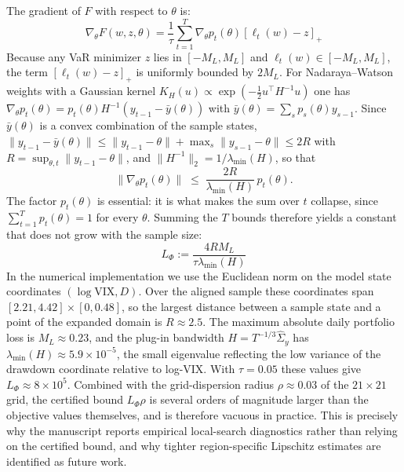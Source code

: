 \documentclass[smallcondensed]{svjour3}
\begin{document}
The gradient of $F$ with respect to $\theta$ is:
\begin{equation}
    \nabla_\theta F(w, z, \theta) = \frac{1}{\tau} \sum_{t=1}^T \nabla_\theta p_t(\theta) [\ell_t(w) - z]_+
\end{equation}
Because any VaR minimizer $z$ lies in $[-M_L, M_L]$ and $\ell_t(w) \in [-M_L, M_L]$, the term $[\ell_t(w) - z]_+$ is uniformly bounded by $2M_L$. For Nadaraya--Watson weights with a Gaussian kernel $K_H(u) \propto \exp(-\frac{1}{2} u^\top H^{-1} u)$ one has $\nabla_\theta p_t(\theta) = p_t(\theta) H^{-1}(y_{t-1} - \bar y(\theta))$ with $\bar y(\theta) = \sum_s p_s(\theta) y_{s-1}$. Since $\bar y(\theta)$ is a convex combination of the sample states, $\|y_{t-1} - \bar y(\theta)\| \le \|y_{t-1}-\theta\| + \max_s \|y_{s-1}-\theta\| \le 2R$ with $R = \sup_{\theta, t} \|y_{t-1} - \theta\|$, and $\|H^{-1}\|_2 = 1/\lambda_{\min}(H)$, so that
\begin{equation}
    \|\nabla_\theta p_t(\theta)\| \;\le\; \frac{2R}{\lambda_{\min}(H)}\, p_t(\theta).
\end{equation}
The factor $p_t(\theta)$ is essential: it is what makes the sum over $t$ collapse, since $\sum_{t=1}^T p_t(\theta) = 1$ for every $\theta$. Summing the $T$ bounds therefore yields a constant that does not grow with the sample size:
\begin{equation}
    L_\Phi := \frac{4 R M_L}{\tau \lambda_{\min}(H)}
\end{equation}
In the numerical implementation we use the Euclidean norm on the model state
coordinates $(\log \mathrm{VIX}, D)$. Over the aligned sample these coordinates
span $[2.21, 4.42] \times [0, 0.48]$, so the largest distance between a sample
state and a point of the expanded domain is $R \approx 2.5$. The maximum
absolute daily portfolio loss is $M_L \approx 0.23$, and the plug-in bandwidth
$H = T^{-1/3}\widehat\Sigma_y$ has $\lambda_{\min}(H) \approx 5.9 \times 10^{-5}$,
the small eigenvalue reflecting the low variance of the drawdown coordinate
relative to log-VIX. With $\tau = 0.05$ these values give
$L_\Phi \approx 8 \times 10^{5}$. Combined with the grid-dispersion radius
$\rho \approx 0.03$ of the $21 \times 21$ grid, the certified bound
$L_\Phi \rho$ is several orders of magnitude larger than the objective values
themselves, and is therefore vacuous in practice. This is precisely why the
manuscript reports empirical local-search diagnostics rather than relying on
the certified bound, and why tighter region-specific Lipschitz estimates are
identified as future work.
\end{document}
